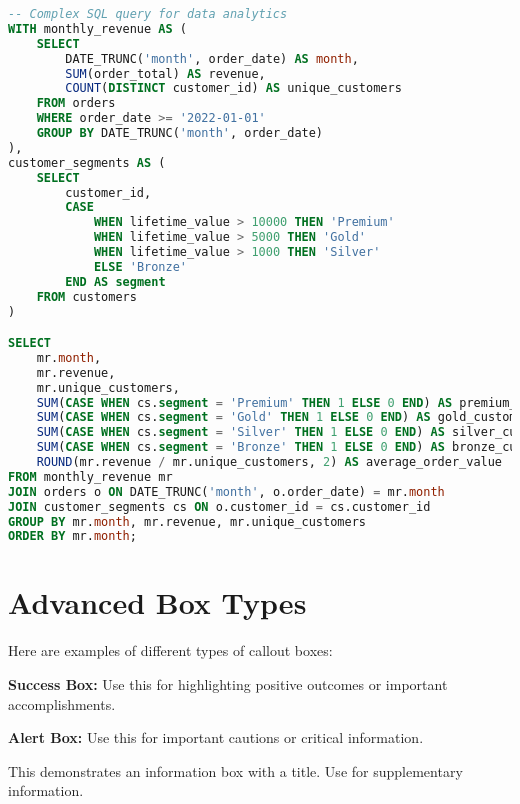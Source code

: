 \documentclass[a4paper,11pt]{article}
\begin{document}
\begin{lstlisting}[language=SQL, caption=Database Query for Analytics, label=lst:sql]
-- Complex SQL query for data analytics
WITH monthly_revenue AS (
    SELECT
        DATE_TRUNC('month', order_date) AS month,
        SUM(order_total) AS revenue,
        COUNT(DISTINCT customer_id) AS unique_customers
    FROM orders
    WHERE order_date >= '2022-01-01'
    GROUP BY DATE_TRUNC('month', order_date)
),
customer_segments AS (
    SELECT
        customer_id,
        CASE
            WHEN lifetime_value > 10000 THEN 'Premium'
            WHEN lifetime_value > 5000 THEN 'Gold'
            WHEN lifetime_value > 1000 THEN 'Silver'
            ELSE 'Bronze'
        END AS segment
    FROM customers
)

SELECT
    mr.month,
    mr.revenue,
    mr.unique_customers,
    SUM(CASE WHEN cs.segment = 'Premium' THEN 1 ELSE 0 END) AS premium_customers,
    SUM(CASE WHEN cs.segment = 'Gold' THEN 1 ELSE 0 END) AS gold_customers,
    SUM(CASE WHEN cs.segment = 'Silver' THEN 1 ELSE 0 END) AS silver_customers,
    SUM(CASE WHEN cs.segment = 'Bronze' THEN 1 ELSE 0 END) AS bronze_customers,
    ROUND(mr.revenue / mr.unique_customers, 2) AS average_order_value
FROM monthly_revenue mr
JOIN orders o ON DATE_TRUNC('month', o.order_date) = mr.month
JOIN customer_segments cs ON o.customer_id = cs.customer_id
GROUP BY mr.month, mr.revenue, mr.unique_customers
ORDER BY mr.month;
\end{lstlisting}

\section{Advanced Box Types}
\label{sec:boxes}

Here are examples of different types of callout boxes:

\begin{successbox}
\textbf{Success Box:} Use this for highlighting positive outcomes or important accomplishments.
\end{successbox}

\begin{alertbox}
\textbf{Alert Box:} Use this for important cautions or critical information.
\end{alertbox}

\begin{infobox}[title=Information Box with Title]
This demonstrates an information box with a title. Use for supplementary information.
\end{infobox}
\end{document}
